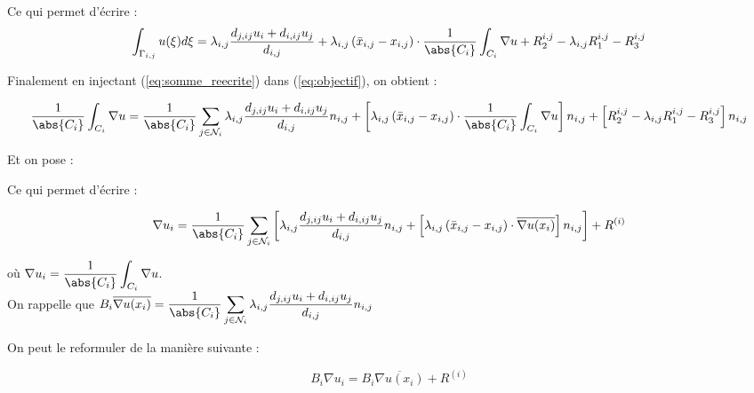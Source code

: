 \documentclass[12pt,a4paper]{article}
\begin{document}
	Ce qui permet d'écrire : \begin{equation}\label{eq:somme_reecrite}
		\displaystyle\int_{\Gamma_{i,j}} u( \xi)d \xi = \lambda_{i,j}\dfrac{d_{j,ij}u_i + d_{i,ij}u_j}{d_{i,j}} + \lambda_{i,j}\left( {\bar x_{i,j}-x_{i,j}}\right)\cdot\dfrac1{\abs{C_i}}\displaystyle\int_{C_i}  {\nabla u} + R_2^{i,j} - \lambda_{i,j}R_1^{i,j} - R_3^{i,j}
	\end{equation}
	
	
	Finalement en injectant (\ref{eq:somme_reecrite}) dans (\ref{eq:objectif}), on obtient :
	
	\begin{equation}\label{eq:preque_final}
		\dfrac1{\abs{C_i}}\displaystyle\int_{C_i}  {\nabla u} = \dfrac1{\abs{C_i}}\sum_{j \in \mathcal N_i} \lambda_{i,j}\dfrac{d_{j,ij}u_i + d_{i,ij}u_j}{d_{i,j}} {n_{i,j}} + \left[\lambda_{i,j}\left( {\bar x_{i,j}-x_{i,j}}\right)\cdot\dfrac1{\abs{C_i}}\displaystyle\int_{C_i}  {\nabla u}\right]  {n_{i,j}} + \left[R_2^{i,j} - \lambda_{i,j}R_1^{i,j} - R_3^{i,j}\right]  {n_{i,j}}
	\end{equation}
	
	Et on pose :
	
	
	Ce qui permet d'écrire : 
	
	\begin{equation}\label{eq:final}
		{\nabla u}_i = \dfrac1{\abs{C_i}}\displaystyle\sum_{j \in \mathcal N_i} \left[\lambda_{i,j}\dfrac{d_{j,ij}u_i + d_{i,ij}u_j}{d_{i,j}} {n_{i,j}} + \left[\lambda_{i,j}\left( {\bar x_{i,j}-x_{i,j}}\right)\cdot {\overline{ {\nabla u}(x_i)}}\right]  {n_{i,j}}\right] +  {R^{(i)}}
	\end{equation}
	
	où $ {\nabla u}_i = \dfrac1{\abs{C_i}}\displaystyle\int_{C_i} {\nabla u}$.\\
	
	On rappelle que $B_i  {\overline{\nabla u(x_i)}} = \dfrac1{\abs{C_i}}\displaystyle\sum_{j \in \mathcal N_i} \lambda_{i,j}\dfrac{d_{j,ij}u_i + d_{i,ij}u_j}{d_{i,j}} {n_{i,j}}$
	
	On peut le reformuler de la manière suivante :
	
	\begin{equation}\label{eq:reformulation_final}
		B_i  {\nabla u}_i = B_i  {\overline{ {\nabla u}(x_i)}}+  {R^{(i)}}
	\end{equation}
	
\end{document}
